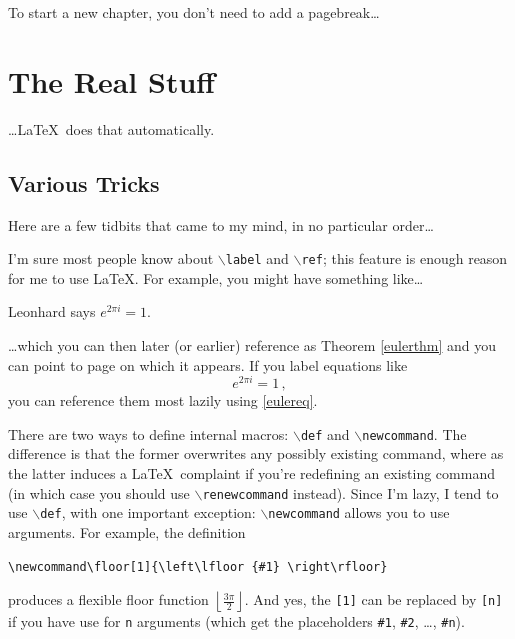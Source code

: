 To start a new chapter, you don't need to add a pagebreak\dots

\chapter{The Real Stuff}

\dots \LaTeX \ does that automatically.

\section{Various Tricks}

Here are a few tidbits that came to my mind, in no particular order\dots

I'm sure most people know about {\tt $\backslash$label} and {\tt $\backslash$ref}; this feature is enough reason for me to use \LaTeX. 
For example, you might have something like\dots

\begin{theorem}[Euler]\label{eulerthm}
Leonhard says $e^{ 2 \pi i } = 1$.
\end{theorem}

\dots which you can then later (or earlier) reference as Theorem \ref{eulerthm} and you can point to page \pageref{eulerthm} on which it appears.
If you label equations like
\begin{equation}\label{eulereq}
  e^{ 2 \pi i } = 1 \, ,
\end{equation}
you can reference them most lazily using \eqref{eulereq}.

\def\v{{\mathbf v}}
\def\P{{\mathcal P}}
\def\Z{\mathbb{Z}}
\newcommand\floor[1]{\left\lfloor {#1} \right\rfloor} 

There are two ways to define internal macros: {\tt $\backslash$def} and {\tt $\backslash$newcommand}. The difference is that the former overwrites any possibly existing command,
where as the latter induces a \LaTeX \ complaint if you're redefining an existing command (in which case you should use {\tt $\backslash$renewcommand} instead). Since I'm lazy,
I tend to use {\tt $\backslash$def}, with one important exception: {\tt $\backslash$newcommand} allows you to use arguments. For example, the definition
\begin{verbatim}
\newcommand\floor[1]{\left\lfloor {#1} \right\rfloor} 
\end{verbatim}
produces a flexible floor function $\floor{\frac{ 3\pi }{ 2 }}$. And yes, the {\tt [1]} can be replaced by {\tt [n]} if you have use for {\tt n} arguments (which get the
placeholders {\tt \#1}, {\tt \#2}, \dots, {\tt \#n}).

